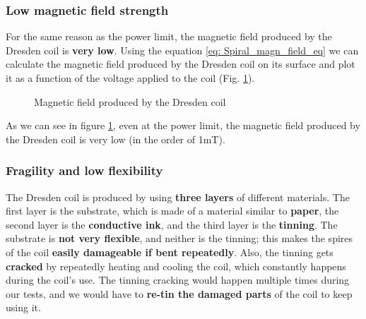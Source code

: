 \subsubsection{Low magnetic field strength}
For the same reason as the power limit, the magnetic field produced by the Dresden coil is \textbf{very low}.
Using the equation \ref{eq: Spiral_magn_field_eq} we can calculate the magnetic field produced by the Dresden coil on its surface and plot it as a function of the voltage applied to the coil (Fig. \ref{fig: Dresden_magnetic_field}).
\begin{figure}[H]
    \centering
    \resizebox{0.5\textwidth}{!}{}
    \caption{Magnetic field produced by the Dresden coil}
    \label{fig: Dresden_magnetic_field}
\end{figure}

As we can see in figure \ref{fig: Dresden_magnetic_field}, even at the power limit, the magnetic field produced by the Dresden coil is very low (in the order of 1mT).

\subsubsection{Fragility and low flexibility}
The Dresden coil is produced by using \textbf{three layers} of different materials.
The first layer is the substrate, which is made of a material similar to \textbf{paper}, the second layer is the \textbf{conductive ink}, and the third layer is the \textbf{tinning}.
The substrate is \textbf{not very flexible}, and neither is the tinning;
this makes the spires of the coil \textbf{easily damageable if bent repeatedly}.
Also, the tinning gets \textbf{cracked} by repeatedly heating and cooling the coil, which constantly happens during the coil's use.
The tinning cracking would happen multiple times during our tests, and we would have to \textbf{re-tin the damaged parts} of the coil to keep using it.
